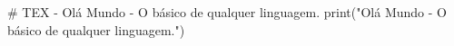 # TEX - Olá Mundo - O básico de qualquer linguagem.
print("Olá Mundo - O básico de qualquer linguagem.")
